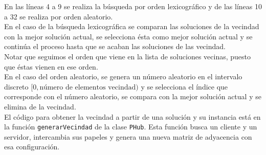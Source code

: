 \documentclass[12pt,a4paper,twoside,openright,titlepage,final]{article}
\begin{document}
En las líneas 4 a 9 se realiza la búsqueda por orden lexicográfico y de las líneas 10 a 32 se realiza por orden aleatorio.\\
En el caso de la búsqueda lexicográfica se comparan las soluciones de la vecindad con la mejor solución actual, se selecciona ésta como mejor solución actual y se continúa el proceso hasta que se acaban las soluciones de las vecindad.\\
Notar que seguimos el orden que viene en la lista de soluciones vecinas, puesto que éstas vienen en ese orden.\\
En el caso del orden aleatorio, se genera un número aleatorio en el intervalo discreto $[0, \text{número de elementos vecindad})$ y se selecciona el índice que corresponde con el número aleatorio, se compara con la mejor solución actual y se elimina de la vecindad.\\

El código para obtener la vecindad a partir de una solución y su instancia está en la función \texttt{generarVecindad} de la clase \texttt{PHub}. Esta función busca un cliente y un servidor, intercambia sus papeles y genera una nueva matriz de adyacencia con esa configuración.
\end{document}
